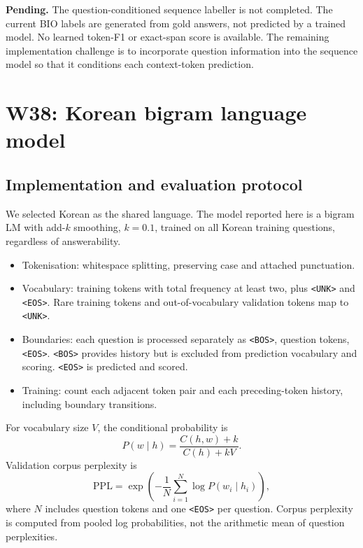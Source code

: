 \documentclass[11pt,a4paper]{article}
\newcommand{\unk}{\texttt{<UNK>}}
\newcommand{\bos}{\texttt{<BOS>}}
\newcommand{\eos}{\texttt{<EOS>}}
\begin{document}
\textbf{Pending.} The question-conditioned sequence labeller is not completed. The current BIO labels are generated from gold answers, not predicted by a trained model. No learned token-F1 or exact-span score is available. The remaining implementation challenge is to incorporate question information into the sequence model so that it conditions each context-token prediction.

\section{W38: Korean bigram language model}
\subsection{Implementation and evaluation protocol}
We selected Korean as the shared language. The model reported here is a bigram LM with add-$k$ smoothing, $k=0.1$, trained on all Korean training questions, regardless of answerability.
\begin{itemize}
\item Tokenisation: whitespace splitting, preserving case and attached punctuation.
\item Vocabulary: training tokens with total frequency at least two, plus \unk{} and \eos{}. Rare training tokens and out-of-vocabulary validation tokens map to \unk{}.
\item Boundaries: each question is processed separately as \bos{}, question tokens, \eos{}. \bos{} provides history but is excluded from prediction vocabulary and scoring. \eos{} is predicted and scored.
\item Training: count each adjacent token pair and each preceding-token history, including boundary transitions.
\end{itemize}
For vocabulary size $V$, the conditional probability is
\[
P(w\mid h)=\frac{C(h,w)+k}{C(h)+kV}.
\]
Validation corpus perplexity is
\[
\mathrm{PPL}=\exp\left(-\frac{1}{N}\sum_{i=1}^{N}\log P(w_i\mid h_i)\right),
\]
where $N$ includes question tokens and one \eos{} per question. Corpus perplexity is computed from pooled log probabilities, not the arithmetic mean of question perplexities.
\end{document}
